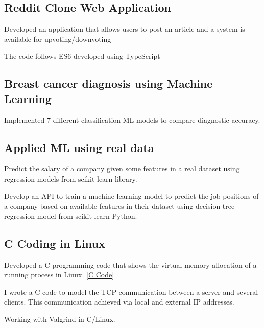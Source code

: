\documentclass[letter,10pt]{article}
\begin{document}
	
	\subsection{Reddit Clone Web Application}
	\begin{zitemize}
		\item Developed an application that allows users to post an article and a system is available for upvoting/downvoting
		\item The code follows ES6 developed using TypeScript
	\end{zitemize}

	\subsection{Breast cancer diagnosis using Machine Learning}
	\begin{zitemize}
		\item Implemented 7 different classification ML models to compare diagnostic accuracy.
	\end{zitemize}	
	\subsection{Applied ML using real data}
	\begin{zitemize}
		\item Predict the salary of a company given some features in a real dataset using regression models from scikit-learn library.
		\item Develop an API to train a machine learning model to predict the job positions of a company based on available features in their dataset using decision tree regression model from scikit-learn Python.
	\end{zitemize}

	\subsection{C Coding in Linux}
	\begin{zitemize}
		\item Developed a C programming code that shows the virtual memory allocation of a running process in Linux. [\href{https://github.com/Hadi2525/vmemory_maps}{C Code}]
		\item I wrote a C code to model the TCP communication between a server and several clients. This communication achieved via local and external IP addresses.
		\item Working with Valgrind in C/Linux.
	\end{zitemize}
\end{document}

